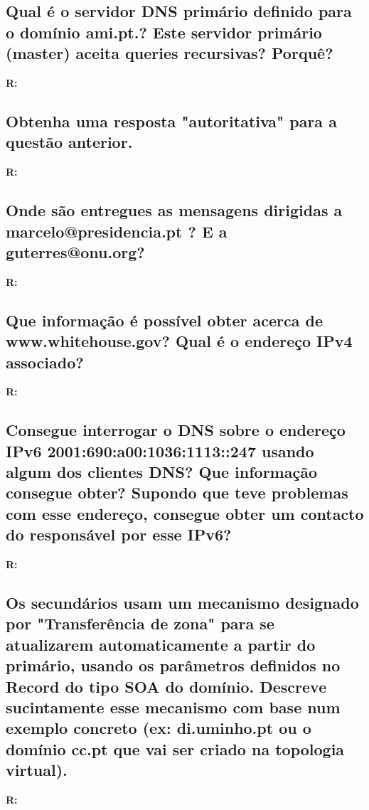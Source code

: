 \documentclass{llncs}
\begin{document}
\subsection{\textbf{Qual é o servidor DNS primário definido para o domínio ami.pt.? Este servidor primário (master) aceita queries
recursivas? Porquê?}}
\textbf{R:}


\subsection{\textbf{Obtenha uma resposta "autoritativa" para a questão anterior.}}
\textbf{R:}


\subsection{\textbf{Onde são entregues as mensagens dirigidas a marcelo@presidencia.pt ? E a guterres@onu.org?}}
\textbf{R:}


\subsection{\textbf{Que informação é possível obter acerca de www.whitehouse.gov? Qual é o endereço IPv4 associado?}}
\textbf{R:}


\subsection{\textbf{Consegue interrogar o DNS sobre o endereço IPv6 2001:690:a00:1036:1113::247 usando algum dos clientes DNS? Que informação consegue obter? Supondo que teve problemas com esse endereço, consegue obter um contacto do responsável por esse IPv6?}}
\textbf{R:}


\subsection{\textbf{Os secundários usam um mecanismo designado por "Transferência de zona" para se atualizarem automaticamente a partir do primário, usando os parâmetros definidos no Record do tipo SOA do domínio. Descreve sucintamente esse mecanismo com base num exemplo concreto (ex: di.uminho.pt ou o domínio cc.pt que vai ser criado na topologia virtual).}}
\textbf{R:}
\end{document}
